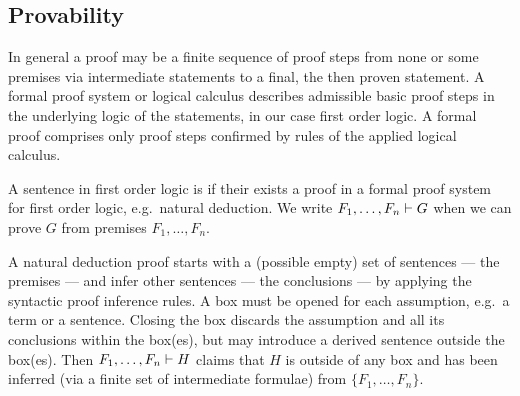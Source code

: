 
\subsection{Provability}

In general a proof may be a finite sequence of proof steps
from none or some premises via intermediate statements
to a final, the then proven statement.
A formal proof system or logical calculus describes admissible basic proof steps
in the underlying logic of the statements, in our case first order logic.
A formal proof comprises only proof steps confirmed by rules of the applied logical calculus.



\begin{definition}
	A sentence in first order logic is 
	if their exists a proof in a formal proof system for first order logic,
	e.g.~natural deduction.
	We write
	\( F_1, \ldots, F_n \vdash G \)
	when we can prove \(G\) from premises \( F_1,\ldots,F_n \).
\end{definition}

A natural deduction proof starts with a (possible empty) set of sentences --- the premises ---
and infer other sentences --- the conclusions --- by applying the syntactic proof inference rules.
A box must be opened for each assumption, e.g.~a term or a sentence.
Closing the box discards the assumption and all its conclusions within the box{(es)},
but may introduce a derived sentence outside the box{(es)}.
Then \( F_1,\ldots,F_n \vdash H \) claims that \( H \)
is outside of any box
and has been inferred (via a finite set of intermediate formulae)
from \( \{ F_1,\ldots,F_n\} \).

